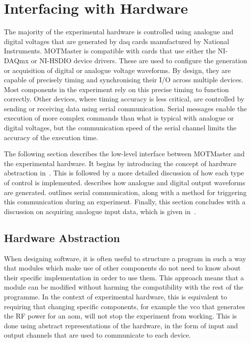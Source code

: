 \section{Interfacing with Hardware}\label{sec:mm_interface}

The majority of the experimental hardware is controlled using analogue and
digital voltages that are generated by \ac{daq} cards manufactured by
National Instruments. MOTMaster is compatible with cards that use either the
NI-DAQmx or NI-HSDIO device drivers. These are used to configure the
generation or acquisition of digital or analogue voltage waveforms. By design, they are
capable of precisely timing and synchronising their I/O across multiple
devices. Most components in the experiment rely on this precise timing to
function correctly. Other devices, where timing accuracy is less critical,
are controlled by sending or receiving data using serial
communication. Serial messages enable the execution of more complex
commands than what is typical with analogue or
digital voltages, but the communication speed of the serial channel limits
the accuracy of the execution time. \par\noindent
The following section describes the low-level interface between
MOTMaster and the experimental hardware. It begins by introducing the
concept of hardware abstraction
in~. This is followed
by a more detailed discussion of how each type of control is
implemented.  describes
how analogue and digital output waveforms are generated.
 outlines serial
communication, along with a method for triggering this communication
during an experiment. Finally, this section concludes with a
discussion on acquiring analogue input data, which is given
in~.

\subsection{Hardware Abstraction}\label{subsec:compinterface_hwabstraction}
When designing software, it is often useful to structure a program in such a
way that modules which make use of other components do not need to know about
their specific implementation in order to use them. This approach
means that a module can be modified without harming the
compatibility with the rest of the programme. In the context of experimental
hardware, this is equivalent to requiring that changing specific components,
for example the \ac{vco} that generates the RF power for an \ac{aom}, will
not stop the experiment from working. This is done using abstract
representations of the hardware, in the form of input and output channels
that are used to communicate to each device. 

